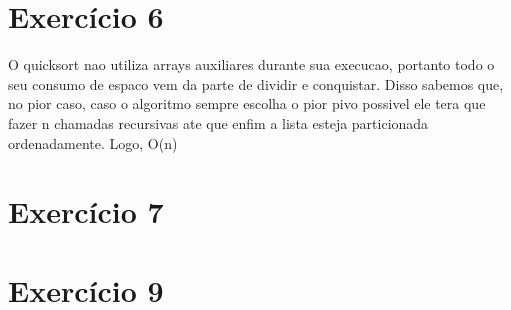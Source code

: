 \documentclass[a4paper,12pt]{article}
\begin{document}
\section*{Exercício 6}
O quicksort nao utiliza arrays auxiliares durante sua execucao, portanto todo o seu consumo de espaco vem da parte de dividir e conquistar. Disso sabemos que, no pior caso, caso o algoritmo sempre escolha o pior pivo possivel ele tera que fazer n chamadas recursivas ate que enfim a lista esteja particionada ordenadamente. Logo, O(n)

\section*{Exercício 7}
\section{Exercício 9}
\begin{algorithm}[H]
\SetAlgoLined
\caption{median}

\end{algorithm}
\end{document}

